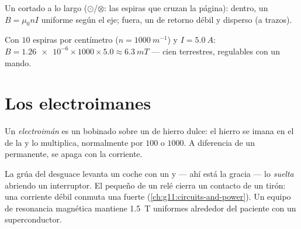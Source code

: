 \begin{omfigure}

{\small Un  cortado a lo largo ($\odot$/$\otimes$: las espiras
que cruzan la página): dentro, un $B = \mu_0 n I$ uniforme según el eje;
fuera, un  de retorno débil y disperso (a trazos).}
\end{omfigure}

\begin{example}\label{ex:g11:magnetic-fields:solenoid}
Con $10$ espiras por centímetro ($n = \qty{1000}{m^{-1}}$) y
$I = \qty{5.0}{A}$:
$B = \num{1.26e-6} \times 1000 \times 5.0 \approx \qty{6.3}{mT}$ ---
cien  terrestres, regulables con un mando.
\end{example}

\section{Los electroimanes}

\begin{definition}[Electroimán]\label{def:g11:magnetic-fields:electromagnet}
Un \emph{electroimán} es un  bobinado sobre
un  de hierro dulce: el hierro se imana en el  de la  y
lo multiplica, normalmente por $100$ o $1000$. A diferencia de un 
permanente, se apaga con la corriente.
\end{definition}

\begin{remark}\label{rem:g11:magnetic-fields:machines}
La grúa del desguace levanta un coche con un  y --- ahí está
la gracia --- lo \emph{suelta} abriendo un interruptor. El pequeño
 de un relé cierra un contacto de un tirón: una corriente
débil conmuta una fuerte (\cref{ch:g11:circuits-and-power}). Un equipo
de resonancia magnética mantiene \qty{1.5}{T} uniformes alrededor del
paciente con un  superconductor.
\end{remark}


